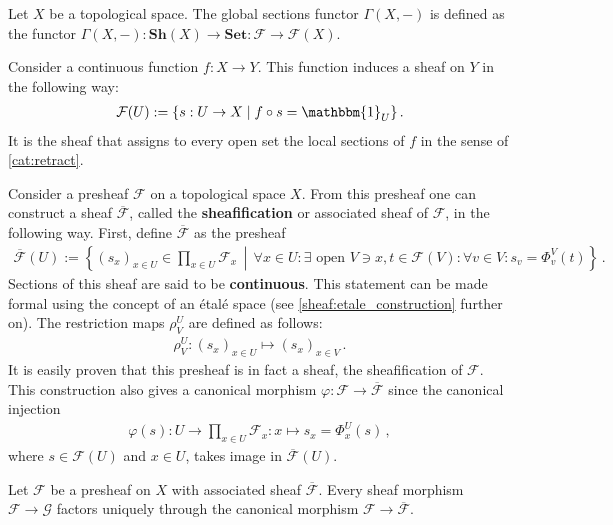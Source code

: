     \begin{example}\label{sheaf:global_sections_functor}
        Let $X$ be a topological space. The global sections functor $\Gamma(X,-)$ is defined as the functor $\Gamma(X,-):\mathbf{Sh}(X)\rightarrow\mathbf{Set}:\mathcal{F}\rightarrow\mathcal{F}(X)$.
    \end{example}
    \begin{example}
        Consider a continuous function $f:X\rightarrow Y$. This function induces a sheaf on $Y$ in the following way:
        \begin{gather}
            \mathcal{F}(U) := \{s:U\rightarrow X\mid f\circ s=\mathbbm{1}_U\}\,.
        \end{gather}
        It is the sheaf that assigns to every open set the local sections of $f$ in the sense of \cref{cat:retract}.
    \end{example}

    \begin{construct}
        Consider a presheaf $\mathcal{F}$ on a topological space $X$. From this presheaf one can construct a sheaf $\overline{\mathcal{F}}$, called the \textbf{sheafification} or associated sheaf of $\mathcal{F}$, in the following way. First, define $\overline{\mathcal{F}}$ as the presheaf
        \begin{gather}
            \overline{\mathcal{F}}(U) := \left\{(s_x)_{x\in U}\in\prod_{x\in U}\mathcal{F}_x\,\middle\vert\,\forall x\in U:\exists\text{ open }V\ni x,t\in\mathcal{F}(V):\forall v\in V:s_v = \Phi^V_v(t)\right\}\,.
        \end{gather}
        Sections of this sheaf are said to be \textbf{continuous}. This statement can be made formal using the concept of an \'etal\'e space (see \cref{sheaf:etale_construction} further on). The restriction maps $\rho^U_V$ are defined as follows:
        \begin{gather}
            \rho^U_V:(s_x)_{x\in U}\mapsto(s_x)_{x\in V}\,.
        \end{gather}
        It is easily proven that this presheaf is in fact a sheaf, the sheafification of $\mathcal{F}$. This construction also gives a canonical morphism $\varphi:\mathcal{F}\rightarrow\overline{\mathcal{F}}$ since the canonical injection
        \begin{gather}
            \varphi(s):U\rightarrow\prod_{x\in U}\mathcal{F}_x:x \mapsto s_x = \Phi^U_x(s)\,,
        \end{gather}
        where $s\in\mathcal{F}(U)$ and $x\in U$, takes image in $\overline{\mathcal{F}}(U)$.
    \end{construct}
    \begin{uproperty}
        Let $\mathcal{F}$ be a presheaf on $X$ with associated sheaf $\overline{\mathcal{F}}$. Every sheaf morphism $\mathcal{F}\rightarrow \mathcal{G}$ factors uniquely through the canonical morphism $\mathcal{F}\rightarrow\overline{\mathcal{F}}$.
    \end{uproperty}

